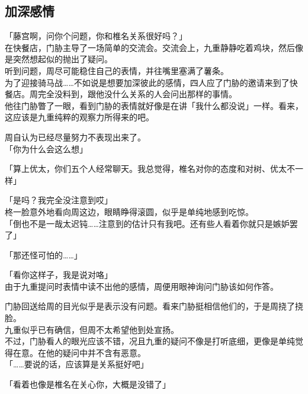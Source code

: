 \subsection{加深感情}

「藤宫啊，问你个问题，你和椎名关系很好吗？」\\

在快餐店，门胁主导了一场简单的交流会。交流会上，九重静静吃着鸡块，然后像是突然想起似的抛出了疑问。\\

听到问题，周尽可能稳住自己的表情，并往嘴里塞满了薯条。\\

为了迎接骑马战……不如说是想要加深彼此的感情，四人应了门胁的邀请来到了快餐店。周完全没料到，跟他没什么关系的人会问出那样的事情。\\

他往门胁瞥了一眼，看到门胁的表情就好像是在讲「我什么都没说」一样。看来，这应该是九重纯粹的观察力所得来的吧。

周自认为已经尽量努力不表现出来了。\\

「你为什么会这么想」

「算上优太，你们五个人经常聊天。我总觉得，椎名对你的态度和对树、优太不一样」

「是吗？我完全没注意到哎」\\

柊一脸意外地看向周这边，眼睛睁得滚圆，似乎是单纯地感到吃惊。\\

「倒也不是一哉太迟钝……注意到的估计只有我吧。还有些人看着你就只是嫉妒罢了」

「那还怪可怕的……」

「看你这样子，我是说对咯」\\

由于九重提问时表情中读不出他的感情，周便用眼神询问门胁该如何作答。

门胁回送给周的目光似乎是表示没有问题。看来门胁挺相信他们的，于是周挠了挠脸。\\

九重似乎已有确信，但周不太希望他到处宣扬。\\

不过，门胁看人的眼光应该不错，况且九重的疑问不像是打听底细，更像是单纯觉得在意。在他的疑问中并不含有恶意。\\

「……要说的话，应该算是关系挺好吧」

「看着也像是椎名在关心你，大概是没错了」

